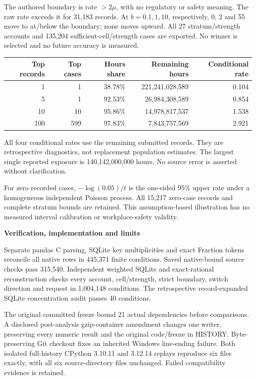 \documentclass[11pt,letterpaper]{article}
\newcommand{\heading}[1]{\vspace{4pt}{\large\bfseries #1}\par}
\newcommand{\BoundBC}{31,183}
\newcommand{\BoundBD}{0}
\newcommand{\BoundBE}{2}
\newcommand{\BoundBF}{55}
\newcommand{\BoundBG}{27}
\newcommand{\BoundBH}{135,204}
\newcommand{\BoundBI}{1}
\newcommand{\BoundBJ}{38.78}
\newcommand{\BoundBK}{221,241,028,589}
\newcommand{\BoundBL}{0.104}
\newcommand{\BoundBM}{1}
\newcommand{\BoundBN}{92.53}
\newcommand{\BoundBO}{26,984,308,589}
\newcommand{\BoundBP}{0.854}
\newcommand{\BoundBQ}{10}
\newcommand{\BoundBR}{95.86}
\newcommand{\BoundBS}{14,978,817,537}
\newcommand{\BoundBT}{1.538}
\newcommand{\BoundBU}{599}
\newcommand{\BoundBV}{97.83}
\newcommand{\BoundBW}{7,843,757,569}
\newcommand{\BoundBX}{2.921}
\newcommand{\BoundBY}{140,142,000,000}
\newcommand{\BoundBZ}{15,217}
\newcommand{\BoundCA}{445,371}
\newcommand{\BoundCB}{315,540}
\newcommand{\BoundCC}{1,004,148}
\newcommand{\BoundCD}{40}
\newcommand{\BoundCE}{21}
\newcommand{\BoundCF}{3.10.11}
\newcommand{\BoundCG}{3.12.14}
\begin{document}
The authored boundary is rate $>2\mu$, with no regulatory or safety meaning. The raw rate exceeds it for \BoundBC{} records. At $b=0.1,1,10$, respectively, \BoundBD{}, \BoundBE{} and \BoundBF{} move to at/below the boundary; none moves upward. All \BoundBG{} stratum/strength accounts and \BoundBH{} sufficient-cell/strength cases are exported. No winner is selected and no future accuracy is measured.

\heading{Retrospective concentration audit: all four cases}
{\small\setlength{\tabcolsep}{6pt}
\begin{tabular}{@{}rrrrr@{}}\toprule
Top records & Top cases & Hours share & Remaining hours & Conditional rate\\\midrule
1 & \BoundBI{} & \BoundBJ{}\% & \BoundBK{} & \BoundBL{} \\
5 & \BoundBM{} & \BoundBN{}\% & \BoundBO{} & \BoundBP{} \\
10 & \BoundBQ{} & \BoundBR{}\% & \BoundBS{} & \BoundBT{} \\
100 & \BoundBU{} & \BoundBV{}\% & \BoundBW{} & \BoundBX{} \\
\bottomrule\end{tabular}}

All four conditional rates use the remaining submitted records. They are retrospective diagnostics, not replacement population estimates. The largest single reported exposure is \BoundBY{} hours. No source error is asserted without clarification.

For zero recorded cases, $-\log(0.05)/t$ is the one-sided 95\% upper rate under a homogeneous independent Poisson process. All \BoundBZ{} zero-case records and complete stratum bounds are retained. This assumption-based illustration has no measured interval calibration or workplace-safety validity.
\newpage
{\Large\bfseries Verification, implementation and limits\par}
\heading{Independent evidence}
Separate pandas C parsing, SQLite key multiplicities and exact Fraction tokens reconcile all native rows in \BoundCA{} finite conditions. Saved native-bound source checks pass \BoundCB{}. Independent weighted SQLite and exact-rational reconstruction checks every account, cell/strength, strict boundary, switch direction and request in \BoundCC{} conditions. The retrospective record-expanded SQLite concentration audit passes \BoundCD{} conditions.

The original committed freeze bound \BoundCE{} actual dependencies before comparisons. A disclosed post-analysis gzip-container amendment changes one writer, preserving every numeric result and the original code/freeze in HISTORY. Byte-preserving Git checkout fixes an inherited Windows line-ending failure. Both isolated full-history CPython \BoundCF{} and \BoundCG{} replays reproduce six files exactly, with all six source-directory files unchanged. Failed compatibility evidence is retained.
\end{document}
